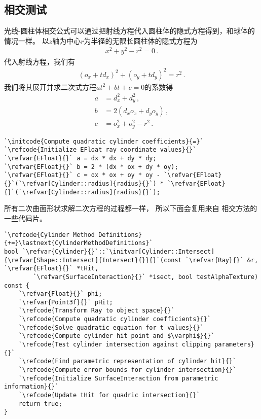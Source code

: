 \subsection{相交测试}\label{sub:相交测试3}
光线-圆柱体相交公式可以通过把射线方程代入圆柱体的隐式方程得到，和球体的情况一样。
以$z$轴为中心$r$为半径的无限长圆柱体的隐式方程为
\begin{align*}
    x^2+y^2-r^2=0\, .
\end{align*}
代入射线方程，我们有
\begin{align*}
    (o_x+td_x)^2+(o_y+td_y)^2=r^2\, .
\end{align*}
我们将其展开并求二次式方程$at^2+bt+c=0$的系数得
\begin{align*}
    a & =d_x^2+d_y^2\, ,      \\
    b & =2(d_xo_x+d_yo_y)\, , \\
    c & =o_x^2+o_y^2-r^2\, .
\end{align*}
\begin{lstlisting}
`\initcode{Compute quadratic cylinder coefficients}{=}`
`\refcode{Initialize EFloat ray coordinate values}{}`
`\refvar{EFloat}{}` a = dx * dx + dy * dy;
`\refvar{EFloat}{}` b = 2 * (dx * ox + dy * oy);
`\refvar{EFloat}{}` c = ox * ox + oy * oy - `\refvar{EFloat}{}`(`\refvar[Cylinder::radius]{radius}{}`) * `\refvar{EFloat}{}`(`\refvar[Cylinder::radius]{radius}{}`);
\end{lstlisting}

所有二次曲面形状求解二次方程的过程都一样，
所以下面会复用来自
相交方法的一些代码片。
\begin{lstlisting}
`\refcode{Cylinder Method Definitions}{+=}\lastnext{CylinderMethodDefinitions}`
bool `\refvar{Cylinder}{}`::`\initvar[Cylinder::Intersect]{\refvar[Shape::Intersect]{Intersect}{}}{}`(const `\refvar{Ray}{}` &r, `\refvar{EFloat}{}` *tHit,
        `\refvar{SurfaceInteraction}{}` *isect, bool testAlphaTexture) const {
    `\refvar{Float}{}` phi;
    `\refvar{Point3f}{}` pHit;
    `\refcode{Transform Ray to object space}{}`
    `\refcode{Compute quadratic cylinder coefficients}{}`
    `\refcode{Solve quadratic equation for t values}{}`
    `\refcode{Compute cylinder hit point and $\varphi$}{}`
    `\refcode{Test cylinder intersection against clipping parameters}{}`
    `\refcode{Find parametric representation of cylinder hit}{}`
    `\refcode{Compute error bounds for cylinder intersection}{}`
    `\refcode{Initialize SurfaceInteraction from parametric information}{}`
    `\refcode{Update tHit for quadric intersection}{}`
    return true;
}
\end{lstlisting}

